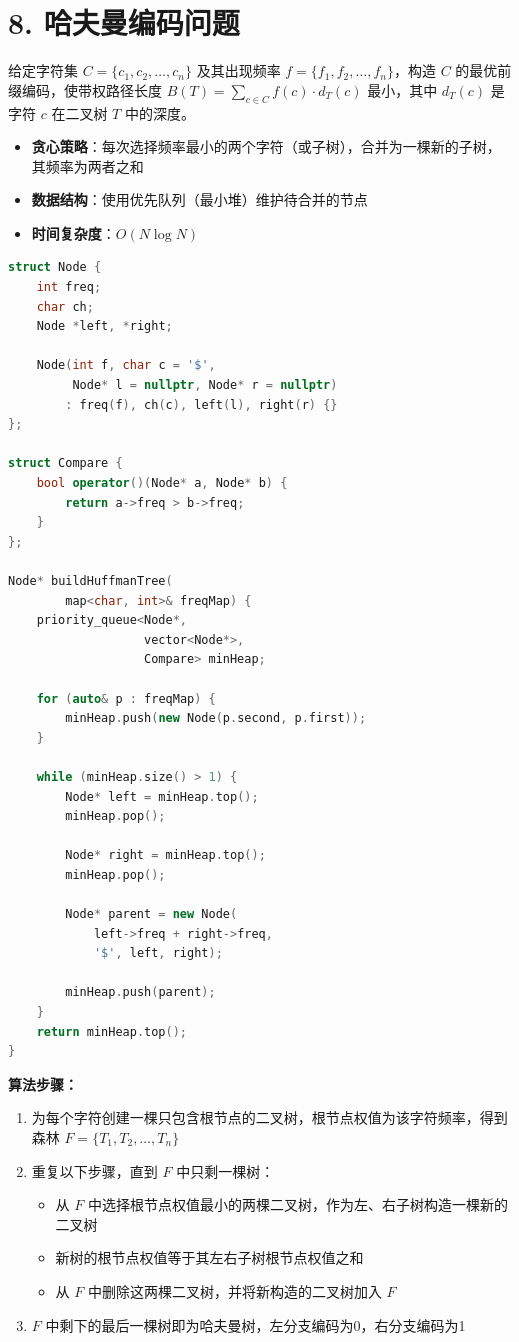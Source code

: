 \section*{8. 哈夫曼编码问题}

给定字符集 $C=\{c_1, c_2, \ldots, c_n\}$ 及其出现频率 $f=\{f_1, f_2, \ldots, f_n\}$，构造 $C$ 的最优前缀编码，使带权路径长度 $B(T) = \sum_{c \in C} f(c) \cdot d_T(c)$ 最小，其中 $d_T(c)$ 是字符 $c$ 在二叉树 $T$ 中的深度。

\begin{itemize}
    \item \textbf{贪心策略}：每次选择频率最小的两个字符（或子树），合并为一棵新的子树，其频率为两者之和
    \item \textbf{数据结构}：使用优先队列（最小堆）维护待合并的节点
    \item \textbf{时间复杂度}：$O(N \log N)$
\end{itemize}

\begin{lstlisting}[language=C++, style=cppstyle]
struct Node {
    int freq;
    char ch;
    Node *left, *right;

    Node(int f, char c = '$',
         Node* l = nullptr, Node* r = nullptr)
        : freq(f), ch(c), left(l), right(r) {}
};

struct Compare {
    bool operator()(Node* a, Node* b) {
        return a->freq > b->freq;
    }
};

Node* buildHuffmanTree(
        map<char, int>& freqMap) {
    priority_queue<Node*,
                   vector<Node*>,
                   Compare> minHeap;

    for (auto& p : freqMap) {
        minHeap.push(new Node(p.second, p.first));
    }

    while (minHeap.size() > 1) {
        Node* left = minHeap.top();
        minHeap.pop();

        Node* right = minHeap.top();
        minHeap.pop();

        Node* parent = new Node(
            left->freq + right->freq,
            '$', left, right);

        minHeap.push(parent);
    }
    return minHeap.top();
}
\end{lstlisting}

\textbf{算法步骤：}
\begin{enumerate}
    \item 为每个字符创建一棵只包含根节点的二叉树，根节点权值为该字符频率，得到森林 $F = \{T_1, T_2, \ldots, T_n\}$
    \item 重复以下步骤，直到 $F$ 中只剩一棵树：
    \begin{itemize}
        \item 从 $F$ 中选择根节点权值最小的两棵二叉树，作为左、右子树构造一棵新的二叉树
        \item 新树的根节点权值等于其左右子树根节点权值之和
        \item 从 $F$ 中删除这两棵二叉树，并将新构造的二叉树加入 $F$
    \end{itemize}
    \item $F$ 中剩下的最后一棵树即为哈夫曼树，左分支编码为0，右分支编码为1
\end{enumerate}
